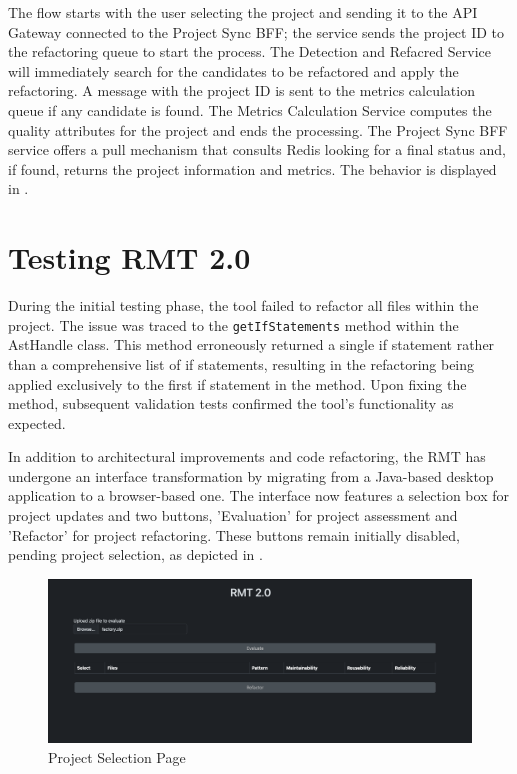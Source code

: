 The flow starts with the user selecting the project and sending it to the API Gateway connected to the Project Sync BFF; the service sends the project ID to the refactoring queue to start the process. The Detection and Refacred Service will immediately search for the candidates to be refactored and apply the refactoring. A message with the project ID is sent to the metrics calculation queue if any candidate is found. The Metrics Calculation Service computes the quality attributes for the project and ends the processing. The Project Sync BFF service offers a pull mechanism that consults Redis looking for a final status and, if found, returns the project information and metrics. The behavior is displayed in .

\section{Testing RMT 2.0}
\label{sec-tests-2.0}

During the initial testing phase, the tool failed to refactor all files within the project. The issue was traced to the \texttt{getIfStatements} method within the AstHandle class. This method erroneously returned a single if statement rather than a comprehensive list of if statements, resulting in the refactoring being applied exclusively to the first if statement in the \cite{liu2014automated} method. Upon fixing the method, subsequent validation tests confirmed the tool's functionality as expected.

In addition to architectural improvements and code refactoring, the RMT has undergone an interface transformation by migrating from a Java-based desktop application to a browser-based one. The interface now features a selection box for project updates and two buttons, 'Evaluation' for project assessment and 'Refactor' for project refactoring. These buttons remain initially disabled, pending project selection, as depicted in .

\begin{figure}[ht!]
\SetCaptionWidth{\textwidth}
\caption{Project Selection Page}
\label{fig-factory-start}
\includegraphics[width =\textwidth]{Chapter-5/Figures/rmt-factory-client-start.png}
\end{figure}
\FloatBarrier

